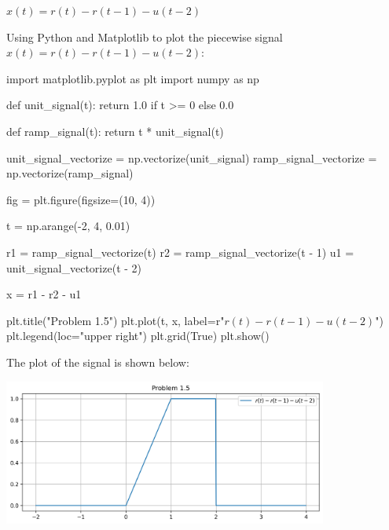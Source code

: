\documentclass[a4paper, 10pt]{article}
\begin{document}
\begin{tosubmit}
\begin{subproblems}[start=5]
    \item \( x(t) = r(t) - r(t - 1) - u(t - 2) \)
\end{subproblems}

\par\noindent\submitsolution
Using Python and Matplotlib to plot the piecewise signal \( x(t) = r(t) - r(t - 1) - u(t - 2) \):
\begin{codingbox}
import matplotlib.pyplot as plt
import numpy as np

def unit_signal(t):
    return 1.0 if t >= 0 else 0.0

def ramp_signal(t):
    return t * unit_signal(t)

unit_signal_vectorize = np.vectorize(unit_signal)
ramp_signal_vectorize = np.vectorize(ramp_signal)

fig = plt.figure(figsize=(10, 4))

t = np.arange(-2, 4, 0.01)

r1 = ramp_signal_vectorize(t)
r2 = ramp_signal_vectorize(t - 1)
u1 = unit_signal_vectorize(t - 2)

x = r1 - r2 - u1

plt.title("Problem 1.5")
plt.plot(t, x, label=r"$r(t) - r(t-1) - u(t-2)$")
plt.legend(loc="upper right")
plt.grid(True)
plt.show()
\end{codingbox}

The plot of the signal is shown below:
\begin{center}
    \includegraphics[width=0.8\textwidth]{images/problem_1_5.png}
\end{center}
\end{tosubmit}


\newpage
\end{document}
